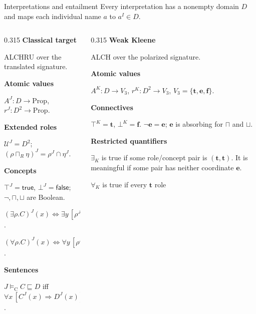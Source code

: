 \documentclass[aspectratio=169,10pt]{beamer}
\newcommand{\CL}{\mathrm{C}}
\newcommand{\ttv}{\mathbf t}
\newcommand{\eev}{\mathbf e}
\begin{document}
\begin{frame}[t]{Interpretations and entailment}
\scriptsize
Every interpretation has a nonempty domain $D$ and maps each individual name $a$ to $a^I\in D$.
\smallskip
\begin{columns}[t,onlytextwidth]
  \begin{column}{0.315\textwidth}
    {\color{accent}\small\bfseries Classical target}\par\smallskip
    ALCHRU over the translated signature.\par\smallskip
    \textbf{Atomic values}\par
    $A^J:D\to\mathrm{Prop}$,\quad
    $r^J:D^2\to\mathrm{Prop}$.\par\smallskip
    \textbf{Extended roles}\par
    $\mathcal U^J=D^2$;\quad
    $(\rho\sqcap_R\eta)^J=\rho^J\cap\eta^J$.\par\smallskip
    \textbf{Concepts}\par
    $\top^J=\mathsf{true}$, $\bot^J=\mathsf{false}$;
    $\neg,\sqcap,\sqcup$ are Boolean.\par
    $(\exists\rho.C)^J(x)\iff
    \exists y\,[\rho^J(x,y)\land C^J(y)]$.\par
    $(\forall\rho.C)^J(x)\iff
    \forall y\,[\rho^J(x,y)\Rightarrow C^J(y)]$.\par\smallskip
    \textbf{Sentences}\par
    $J\models_{\CL}C\sqsubseteq D$ iff
    $\forall x\,[C^J(x)\Rightarrow D^J(x)]$.
  \end{column}
  \begin{column}{0.315\textwidth}
    {\color{accent}\small\bfseries Weak Kleene}\par\smallskip
    ALCH over the polarized signature.\par\smallskip
    \textbf{Atomic values}\par
    $A^K:D\to V_3$,\quad
    $r^K:D^2\to V_3$,\quad
    $V_3=\{\ttv,\eev,\mathbf f\}$.\par\smallskip
    \textbf{Connectives}\par
    $\top^K=\ttv$, $\bot^K=\mathbf f$.
    $\neg\eev=\eev$; $\eev$ is absorbing for
    $\sqcap$ and $\sqcup$.\par\smallskip
    \textbf{Restricted quantifiers}\par
    $\exists_K$ is true if some role/concept pair is
    $(\ttv,\ttv)$. It is meaningful if some pair
    has neither coordinate $\eev$.\par
    $\forall_K$ is true if every $\ttv$ role

\end{column}
\end{columns}
\end{frame}
\end{document}

